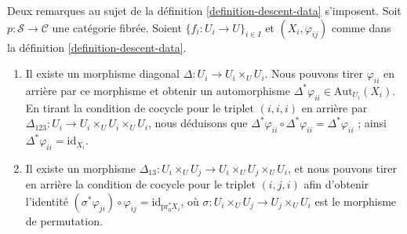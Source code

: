 \begin{remarks}
\label{remarks-definition-descent-datum}
Deux remarques au sujet de la définition \ref{definition-descent-data}
s'imposent. Soit $p : \mathcal{S} \to \mathcal{C}$ une catégorie fibrée.
Soient $\{f_i : U_i \to U\}_{i \in I}$ et $(X_i, \varphi_{ij})$
comme dans la définition \ref{definition-descent-data}.
\begin{enumerate}
\item Il existe un morphisme diagonal $\Delta : U_i \to U_i \times_U U_i$.
Nous pouvons tirer $\varphi_{ii}$ en arrière par ce morphisme et obtenir un
automorphisme $\Delta^\ast \varphi_{ii} \in \text{Aut}_{U_i}(X_i)$.
En tirant la condition de cocycle pour le triplet $(i, i, i)$ en arrière par
$\Delta_{123} : U_i \to U_i \times_U U_i \times_U U_i$, nous déduisons que
$\Delta^\ast \varphi_{ii} \circ \Delta^\ast \varphi_{ii} =
\Delta^\ast \varphi_{ii}$ ; ainsi $\Delta^\ast \varphi_{ii} =
\text{id}_{X_i}$.
\item Il existe un morphisme
$\Delta_{13}: U_i \times_U U_j \to U_i \times_U U_j \times_U U_i$,
et nous pouvons tirer en arrière la condition de cocycle pour le triplet
$(i, j, i)$ afin d'obtenir l'identité
$(\sigma^\ast \varphi_{ji}) \circ \varphi_{ij} =
\text{id}_{\text{pr}_0^\ast X_i}$, où
$\sigma : U_i \times_U U_j \to U_j \times_U U_i$ est le morphisme de permutation.
\end{enumerate}
\end{remarks}

